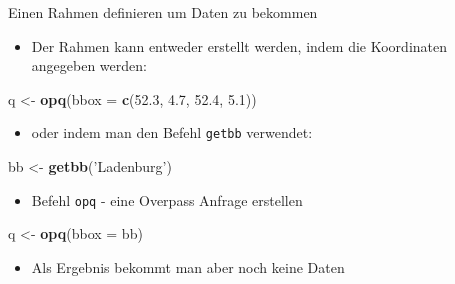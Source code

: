 \documentclass[ignorenonframetext,]{beamer}
\newenvironment{Shaded}{\begin{snugshade}}{\end{snugshade}}
\newcommand{\DataTypeTok}[1]{\textcolor[rgb]{0.13,0.29,0.53}{#1}}
\newcommand{\FloatTok}[1]{\textcolor[rgb]{0.00,0.00,0.81}{#1}}
\newcommand{\KeywordTok}[1]{\textcolor[rgb]{0.13,0.29,0.53}{\textbf{#1}}}
\newcommand{\NormalTok}[1]{#1}
\newcommand{\StringTok}[1]{\textcolor[rgb]{0.31,0.60,0.02}{#1}}
\providecommand{\tightlist}{%
  \setlength{\itemsep}{0pt}\setlength{\parskip}{0pt}}
\begin{document}
\begin{frame}[fragile]{Einen Rahmen definieren um Daten zu bekommen}
\protect\hypertarget{einen-rahmen-definieren-um-daten-zu-bekommen}{}

\begin{itemize}
\tightlist
\item
  Der Rahmen kann entweder erstellt werden, indem die Koordinaten
  angegeben werden:
\end{itemize}

\begin{Shaded}
\begin{Highlighting}[]
\NormalTok{q <-}\StringTok{ }\KeywordTok{opq}\NormalTok{(}\DataTypeTok{bbox =} \KeywordTok{c}\NormalTok{(}\FloatTok{52.3}\NormalTok{, }\FloatTok{4.7}\NormalTok{, }\FloatTok{52.4}\NormalTok{, }\FloatTok{5.1}\NormalTok{))}
\end{Highlighting}
\end{Shaded}

\begin{itemize}
\tightlist
\item
  oder indem man den Befehl \texttt{getbb} verwendet:
\end{itemize}

\begin{Shaded}
\begin{Highlighting}[]
\NormalTok{bb <-}\StringTok{ }\KeywordTok{getbb}\NormalTok{(}\StringTok{'Ladenburg'}\NormalTok{)}
\end{Highlighting}
\end{Shaded}

\begin{itemize}
\tightlist
\item
  Befehl \texttt{opq} - eine Overpass Anfrage erstellen
\end{itemize}

\begin{Shaded}
\begin{Highlighting}[]
\NormalTok{q <-}\StringTok{ }\KeywordTok{opq}\NormalTok{(}\DataTypeTok{bbox =}\NormalTok{ bb)}
\end{Highlighting}
\end{Shaded}

\begin{itemize}
\tightlist
\item
  Als Ergebnis bekommt man aber noch keine Daten
\end{itemize}

\end{frame}
\end{document}

